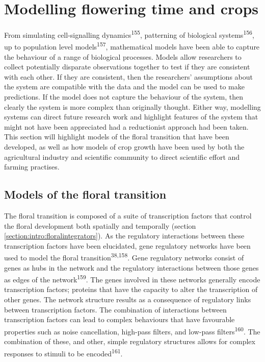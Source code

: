 \documentclass[12pt,]{book}
\begin{document}
\section{Modelling flowering time and
crops}\label{modelling-flowering-time-and-crops}

From simulating cell-signalling dynamics\textsuperscript{155},
patterning of biological systems\textsuperscript{156}, up to population
level models\textsuperscript{157}, mathematical models have been able to
capture the behaviour of a range of biological processes. Models allow
researchers to collect potentially disparate observations together to
test if they are consistent with each other. If they are consistent,
then the researchers' assumptions about the system are compatible with
the data and the model can be used to make predictions. If the model
does not capture the behaviour of the system, then clearly the system is
more complex than originally thought. Either way, modelling systems can
direct future research work and highlight features of the system that
might not have been appreciated had a reductionist approach had been
taken. This section will highlight models of the floral transition that
have been developed, as well as how models of crop growth have been used
by both the agricultural industry and scientific community to direct
scientific effort and farming practises.

\subsection{Models of the floral
transition}\label{models-of-the-floral-transition}

The floral transition is composed of a suite of transcription factors
that control the floral development both spatially and temporally
(section \ref{section:intro:floralintegrators}). As the regulatory
interactions between these transcription factors have been elucidated,
gene regulatory networks have been used to model the floral
transition\textsuperscript{38,158}. Gene regulatory networks consist of
genes as hubs in the network and the regulatory interactions between
those genes as edges of the network\textsuperscript{159}. The genes
involved in these networks generally encode transcription factors;
proteins that have the capacity to alter the transcription of other
genes. The network structure results as a consequence of regulatory
links between transcription factors. The combination of interactions
between transcription factors can lead to complex behaviours that have
favourable properties such as noise cancellation, high-pass filters, and
low-pass filters\textsuperscript{160}. The combination of these, and
other, simple regulatory structures allows for complex responses to
stimuli to be encoded\textsuperscript{161}.
\end{document}
